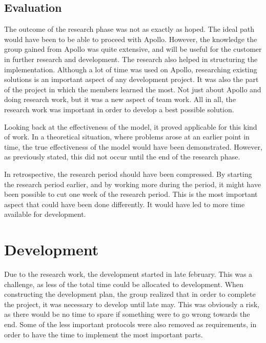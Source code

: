 \subsection{Evaluation}
\label{subsec:project_evaluation-research_phase-evaluation}

The outcome of the research phase was not as exactly as hoped. The ideal path would have been to be able to proceed with Apollo. However, the knowledge the group gained from Apollo was quite extensive, and will be useful for the customer in further research and development. The research also helped in structuring the implementation. Although a lot of time was used on Apollo, researching existing solutions is an important aspect of any development project. It was also the part of the project in which the members learned the most. Not just about Apollo and doing research work, but it was a new aspect of team work. All in all, the research work was important in order to develop a best possible solution.

Looking back at the effectiveness of the model, it proved applicable for this kind of work. In a theoretical situation, where problems arose at an earlier point in time, the true effectiveness of the model would have been demonstrated. However, as previously stated, this did not occur until the end of the research phase.

In retrospective, the research period should have been compressed. By starting the research period earlier, and by working more during the period, it might have been possible to cut one week of the research period. This is the most important aspect that could have been done differently. It would have led to more time available for development.

\section{Development}
\label{sec:project_evaluation-development}

Due to the research work, the development started in late february. This was a challenge, as less of the total time could be allocated to development. When constructing the development plan, the group realized that in order to complete the project, it was necessary to develop until late may. This was obviously a risk, as there would be no time to spare if something were to go wrong towards the end. Some of the less important protocols were also removed as requirements, in order to have the time to implement the most important parts.


